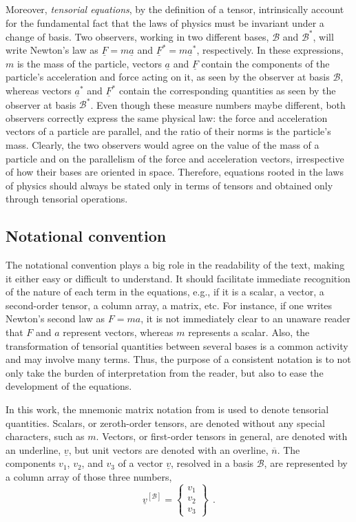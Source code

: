 \documentclass[12pt,a4paper,oneside,english]{abntex2} %
\newcommand{\vect}[1]{\underline{#1}}
\newcommand{\uvec}[1]{\overline{#1}}
\begin{document}
Moreover, \textit{tensorial equations}, by the definition of a tensor, intrinsically account for the fundamental fact that the laws of physics must be invariant under a change of basis. Two observers, working in two different bases, $\mathcal{B}$ and $\mathcal{B^*}$, will write Newton's law as $\vect{F} = m\vect{a}$ and $\vect{F}^* = m\vect{a}^*$, respectively. In these expressions, $m$ is the mass of the particle, vectors $\vect{a}$ and $\vect{F}$ contain the components of the particle's acceleration and force acting on it, as seen by the observer at basis $\mathcal{B}$, whereas vectors $\vect{a}^*$ and $\vect{F}^*$ contain the corresponding quantities as seen by the observer at basis $\mathcal{B^*}$. Even though these measure numbers maybe different, both observers correctly express the same physical law: the force and acceleration vectors of a particle are parallel, and the ratio of their norms is the particle's mass. Clearly, the two observers would agree on the value of the mass of a particle and on the parallelism of the force and acceleration vectors, irrespective of how their bases are oriented in space. Therefore, equations rooted in the laws of physics should always be stated only in terms of tensors and obtained only through tensorial operations.  

\subsection{Notational convention}
\label{sec:notation}

The notational convention plays a big role in the readability of the text, making it either easy or difficult to understand. It should facilitate immediate recognition of the nature of each term in the equations, e.g., if it is a scalar, a vector, a second-order tensor, a column array, a matrix, etc. For instance, if one writes Newton's second law as $F = ma$, it is not immediately clear to an unaware reader that $F$ and $a$ represent vectors, whereas $m$ represents a scalar. Also, the transformation of tensorial quantities between several bases is a common activity and may involve many terms. Thus, the purpose of a consistent notation is to not only take the burden of interpretation from the reader, but also to ease the development of the equations.

In this work, the mnemonic matrix notation from  is used to denote tensorial quantities. Scalars, or zeroth-order tensors, are denoted without any special characters, such as $m$. Vectors, or first-order tensors in general, are denoted with an underline, $\vect{v}$, but unit vectors are denoted with an overline, $\uvec{n}$. The components $v_1$, $v_2$, and $v_3$ of a vector $\vect{v}$, resolved in a basis $\mathcal{B}$, are represented by a column array of those three numbers,
\begin{equation}
    \vect{v}^{[\mathcal{B}]} = \begin{Bmatrix}       
    v_1 \\
    v_2 \\
    v_3
    \end{Bmatrix} \ \ .
    \label{eq:vector_def}
\end{equation}
\end{document}
